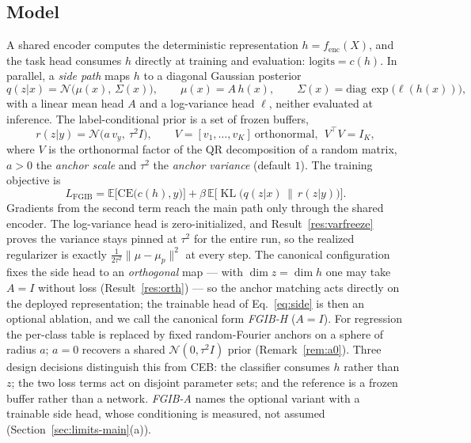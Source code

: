\documentclass{article} %
\newcommand{\KLd}{\operatorname{KL}}
\newcommand{\CE}{\mathrm{CE}}
\newcommand{\Ncal}{\mathcal{N}}
\begin{document}
\subsection{Model}

A shared encoder computes the deterministic representation $h = f_{\mathrm{enc}}(X)$, and
the task head consumes $h$ directly at training and evaluation:
$\mathrm{logits} = c(h)$. In parallel, a \emph{side path} maps $h$ to a diagonal Gaussian
posterior
\begin{equation}
q(z|x) = \Ncal\big(\mu(x),\,\Sigma(x)\big),
\qquad \mu(x) = A\,h(x), \qquad
\Sigma(x) = \mathrm{diag}\,\exp\!\big(\ell(h(x))\big),
\label{eq:side}
\end{equation}
with a linear mean head $A$ and a log-variance head $\ell$, neither evaluated at
inference. The label-conditional prior is a set of frozen buffers,
\begin{equation}
r(z|y) = \Ncal\big(a\,v_y,\ \tau^2 I\big),
\qquad
V = [v_1,\dots,v_K] \ \text{orthonormal},\ \ V^{\top}V = I_K ,
\label{eq:anchor}
\end{equation}
where $V$ is the orthonormal factor of the QR decomposition of a random matrix, $a > 0$
the \emph{anchor scale} and $\tau^2$ the \emph{anchor variance} (default $1$). The
training objective is
\begin{equation}
L_{\mathrm{FGIB}}
= \mathbb{E}\big[\CE\big(c(h), y\big)\big]
+ \beta\,\mathbb{E}\big[\KLd\big(q(z|x)\,\|\,r(z|y)\big)\big] .
\label{eq:loss}
\end{equation}
Gradients from the second term reach the main path only through the shared encoder. The
log-variance head is zero-initialized, and Result~\ref{res:varfreeze} proves the
variance stays pinned at $\tau^2$ for the entire run, so the realized regularizer is
exactly $\tfrac{1}{2\tau^2}\|\mu - \mu_p\|^2$ at every step. The canonical
configuration fixes the side head to an \emph{orthogonal} map --- with
$\dim z = \dim h$ one may take $A = I$ without loss (Result~\ref{res:orth}) --- so the
anchor matching acts directly on the deployed representation; the trainable head of
Eq.~\eqref{eq:side} is then an optional ablation, and we call the canonical form
\emph{FGIB-H} ($A = I$). For regression the per-class table is replaced by fixed
random-Fourier anchors \citep{rahimi2008random} on a sphere of radius $a$; $a = 0$
recovers a shared $\Ncal(0,\tau^2 I)$ prior (Remark~\ref{rem:a0}). Three design
decisions distinguish this from CEB: the classifier consumes $h$ rather than $z$; the
two loss terms act on disjoint parameter sets; and the reference is a frozen buffer
rather than a network. \emph{FGIB-A} names the optional variant with a trainable side
head, whose conditioning is measured, not assumed
(Section~\ref{sec:limits-main}(a)).
\end{document}
